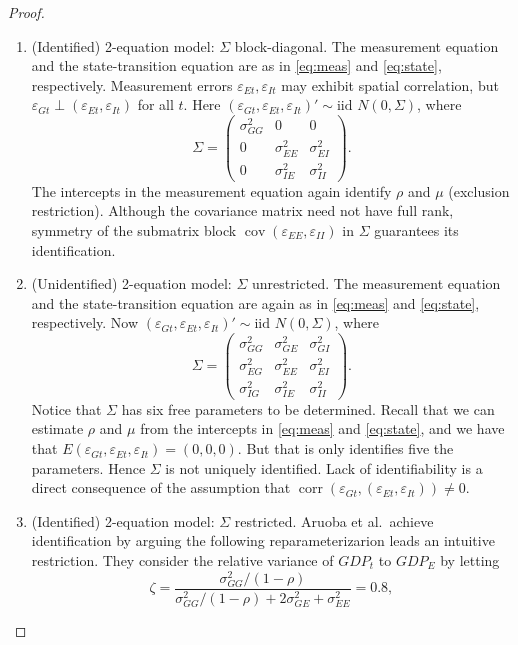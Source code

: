 \documentclass[oneside,reqno]{amsart}
\DeclareMathOperator{\cov}{cov}
\DeclareMathOperator{\corr}{corr}
\newcommand{\eps}{\varepsilon}
\theoremstyle{definition}
\begin{document}
\begin{enumerate}[label=(\roman*)]
\begin{proof}
\begin{enumerate}[label=(\arabic*)]
\item
(Identified) 2-equation model: $\Sigma$ block-diagonal. The measurement equation and the state-transition equation are as in \eqref{eq:meas} and \eqref{eq:state}, respectively. Measurement errors $\eps_{Et}, \eps_{It}$ may exhibit spatial correlation, but $\eps_{Gt} \perp (\eps_{Et}, \eps_{It})$ for all $t$. Here $(\eps_{Gt}, \eps_{Et}, \eps_{It})' \sim \text{iid } N(0, \Sigma)$, where 
\[
	\Sigma = \begin{pmatrix}
		\sigma_{GG}^2 & 0 & 0 \\
		0 & \sigma_{EE}^2 & \sigma_{EI}^2 \\
		0 & \sigma_{IE}^2 &  \sigma_{II}^2
	\end{pmatrix}.
\] 
The intercepts in the measurement equation again identify $\rho$ and $\mu$ (exclusion restriction). Although the covariance matrix need not have full rank, symmetry of the submatrix block $\cov(\eps_{EE}, \eps_{II})$ in $\Sigma$ guarantees its identification.
\item
(Unidentified) 2-equation model: $\Sigma$ unrestricted. The measurement equation and the state-transition equation are again as in \eqref{eq:meas} and \eqref{eq:state}, respectively. Now $(\eps_{Gt}, \eps_{Et}, \eps_{It})' \sim \text{iid } N(0, \Sigma)$, where
\begin{equation}\label{eq:unres-sigma}
	\Sigma = \begin{pmatrix}
		\sigma_{GG}^2 & \sigma_{GE}^2 & \sigma_{GI}^2 \\
		\sigma_{EG}^2 & \sigma_{EE}^2 & \sigma_{EI}^2 \\
		\sigma_{IG}^2 & \sigma_{IE}^2 &  \sigma_{II}^2
	\end{pmatrix}.
\end{equation}
Notice that $\Sigma$ has six free parameters to be determined. Recall that we can estimate $\rho$ and $\mu$ from the intercepts in \eqref{eq:meas} and \eqref{eq:state}, and we have that $E(\eps_{Gt}, \eps_{Et}, \eps_{It}) = (0, 0, 0)$. But that is only identifies five the parameters. Hence $\Sigma$ is not uniquely identified. Lack of identifiability is a direct consequence of the assumption that $\corr(\eps_{Gt}, (\eps_{Et}, \eps_{It})) \neq 0$.
\item
(Identified) 2-equation model: $\Sigma$ restricted. Aruoba et al.\ achieve identification by arguing the following reparameterizarion leads an intuitive restriction. They consider the relative variance of $GDP_t$ to $GDP_E$ by letting
\[
	\zeta = \frac{\sigma_{GG}^2/(1-\rho)}{\sigma_{GG}^2/(1-\rho) + 2 \sigma_{GE}^2 + \sigma_{EE}^2} = 0.8,
\]
\end{enumerate}
\end{proof}
\end{enumerate}
\end{document}
